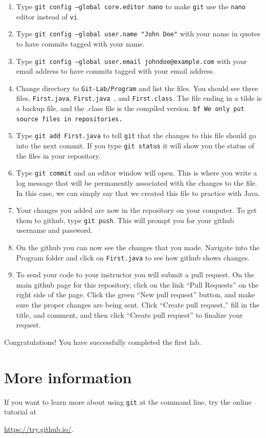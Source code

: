 \documentclass[11pt]{article}
\begin{document}
\begin{enumerate}
\item Type {\tt git config --global core.editor nano} to make {\tt git} use the {\tt nano} editor instead of {\tt vi}.
\item Type {\tt git config --global user.name "John Doe"} with your name in quotes to have commits tagged with your name.
\item Type {\tt git config --global user.email johndoe@example.com} with your email address to have commits tagged with your email address.
\item Change directory to {\tt Git-Lab/Program} and list the files.  You should see three files, {\tt First.java}, {\tt First.java~}, and {\tt First.class}.  The file ending in a tilde is a backup file, and the .class file is the compiled version.  {\tt bf We only put source files in repositories.}
\item Type {\tt git add First.java} to tell {\tt git} that the changes to this file should go into the next commit.  If you type {\tt git status} it will show you the status of the files in your repository.
\item Type {\tt git commit} and an editor window will open.  This is where you write a log message that will be permanently associated with the changes to the file.  In this case, we can simply say that we created this file to practice with Java.
\item Your changes you added are now in the repository on your computer.  To get them to github, type {\tt git push}.  This will prompt you for your github username and password.
\item On the github you can now see the changes that you made.  Navigate into the Program folder and click on {\tt First.java} to see how github shows changes.
\item To send your code to your instructor you will submit a pull request.  On the main github page for this repository, click on the link ``Pull Requests'' on the right side of the page.  Click the green ``New pull request'' button, and make sure the proper changes are being sent.  Click ``Create pull request,'' fill in the title, and comment, and then click ``Create pull request'' to finalize your request.
\end{enumerate}

Congratulations!  You have successfully completed the first lab.

\section*{More information}

If you want to learn more about using {\tt git} at the command line, try the online tutorial at 

\url{https://try.github.io/}.
\end{document}
